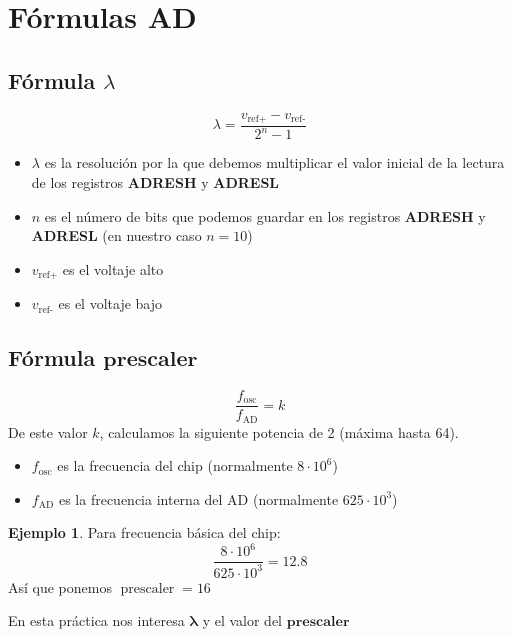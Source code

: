 \documentclass{article}
\theoremstyle{definition} %
\newtheorem{ejemplo}{Ejemplo}[subsection]
\begin{document}
\section{Fórmulas AD}
\subsection{Fórmula $\lambda$}
\large
\[ \lambda = \frac{v_{\text{ref+}}-v_{\text{ref-}}}{2^n-1} \]
\normalsize
\begin{itemize}
  \item $\lambda$ es la resolución por la que debemos multiplicar el valor inicial de la lectura de los registros \textbf{ADRESH} y \textbf{ADRESL}
  \item  $n$ es el número de bits que podemos guardar en los registros  \textbf{ADRESH} y \textbf{ADRESL} (en nuestro caso $n = 10$)
  \item $v_{\text{ref+}}$ es el voltaje alto 
  \item $v_{\text{ref-}}$ es el voltaje bajo
\end{itemize}
\subsection{Fórmula $\mathbf{prescaler}$}
\[ \frac{f_{\text{osc}}}{f_{\text{AD}}} = k \]
De este valor $k$, calculamos la siguiente potencia de 2 (máxima hasta 64).
\begin{itemize}
  \item $f_{\text{osc}}$ es la frecuencia del chip (normalmente $8 \cdot 10^6$)
  \item $f_{\text{AD}}$ es la frecuencia interna del AD (normalmente $625 \cdot 10^3$)
\end{itemize}
\begin{ejemplo} Para frecuencia básica del chip:
  \[ \frac{8 \cdot 10^6}{625 \cdot 10^3} = 12.8\]
  Así que ponemos $\operatorname{prescaler} = 16$
\end{ejemplo}
En esta práctica nos interesa $\boldsymbol{\lambda}$ y el valor del $\mathbf{prescaler}$
\end{document}
